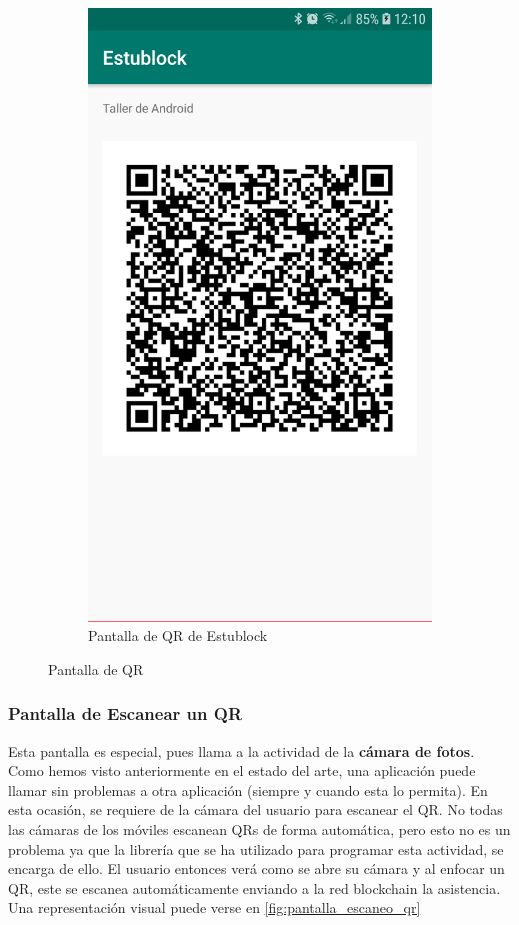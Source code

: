 \begin{figure}[hbt]
\begin{subfigure}[b]{0.4\linewidth}
        \includegraphics[width=0.7\linewidth]{figs/Desarrollo/Interfaz/estublock_QR}
        \caption[Estublock QR]{Pantalla de QR de Estublock}
	\end{subfigure} 
	\caption[Pantalla de QR]{Pantalla de QR}
	\label{fig:pantalla_qr}
\end{figure}

\subsubsection{Pantalla de Escanear un QR}

Esta pantalla es especial, pues llama a la actividad de la \textbf{cámara de fotos}. Como hemos visto anteriormente en el estado del arte, una aplicación puede llamar sin problemas a otra aplicación (siempre y cuando esta lo permita). En esta ocasión, se requiere de la cámara del usuario para escanear el QR. No todas las cámaras de los móviles escanean QRs de forma automática, pero esto no es un problema ya que la librería que se ha utilizado para programar esta actividad, se encarga de ello. El usuario entonces verá como se abre su cámara y al enfocar un QR, este se escanea automáticamente enviando a la red blockchain la asistencia. Una representación visual puede verse en \ref{fig:pantalla_escaneo_qr}

